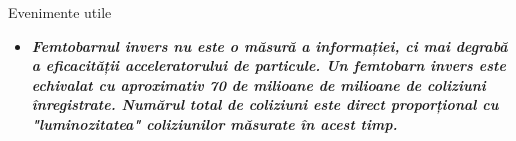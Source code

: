 \documentclass{beamer}
\begin{document}
\begin{frame}{Evenimente utile}

\vspace{3.8cm}
\begin{itemize}
\small    
\item \makebox[0.5cm]{} \textbf{\textit{Femtobarnul invers nu este o măsură a informației, ci mai degrabă a eficacității acceleratorului de particule. Un femtobarn invers este echivalat cu aproximativ 70 de milioane de milioane de coliziuni înregistrate. Numărul total de coliziuni este direct proporțional cu "luminozitatea" coliziunilor măsurate în acest timp.}}



\end{itemize}   
\end{frame}
\end{document}
